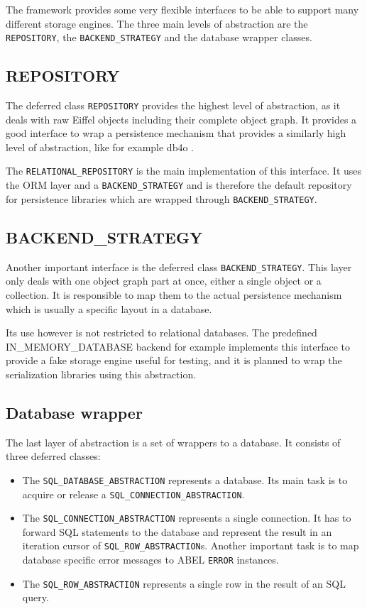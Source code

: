The framework provides some very flexible interfaces to be able to support many different storage engines. 
The three main levels of abstraction are the \lstinline!REPOSITORY!, the \lstinline!BACKEND_STRATEGY! and the database wrapper classes.

\subsection{REPOSITORY}

The deferred class \lstinline!REPOSITORY! provides the highest level of abstraction, as it deals with raw Eiffel objects including their complete object graph.
It provides a good interface to wrap a persistence mechanism that provides a similarly high level of abstraction, like for example db4o \cite{db4o}.

The \lstinline!RELATIONAL_REPOSITORY! is the main implementation of this interface.
It uses the ORM layer and a \lstinline!BACKEND_STRATEGY! and is therefore the default repository for persistence libraries which are wrapped through \lstinline!BACKEND_STRATEGY!.

\subsection{BACKEND\_STRATEGY}

Another important interface is the deferred class \lstinline!BACKEND_STRATEGY!.
This layer only deals with one object graph part at once, either a single object or a collection.
It is responsible to map them to the actual persistence mechanism which is usually a specific layout in a database.

Its use however is not restricted to relational databases.
The predefined IN\_MEMORY\_DATABASE backend for example implements this interface to provide a fake storage engine useful for testing, and it is planned to wrap the serialization libraries using this abstraction.

\subsection{Database wrapper}


The last layer of abstraction is a set of wrappers to a database. 
It consists of three deferred classes: 
\begin{itemize}
 \item The \lstinline!SQL_DATABASE_ABSTRACTION! represents a database. Its main task is to acquire or release a \lstinline!SQL_CONNECTION_ABSTRACTION!.
 \item The \lstinline!SQL_CONNECTION_ABSTRACTION! represents a single connection. 
It has to forward SQL statements to the database and represent the result in an iteration cursor of \lstinline!SQL_ROW_ABSTRACTION!s.
Another important task is to map database specific error messages to ABEL \lstinline!ERROR! instances.
  \item The \lstinline!SQL_ROW_ABSTRACTION! represents a single row in the result of an SQL query.
\end{itemize}

